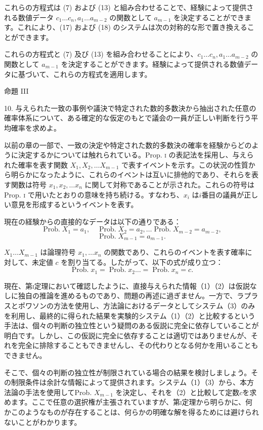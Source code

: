 \documentclass[a4paper,11pt,openany]{ltjsbook}
\begin{document}
これらの方程式は (7) および (13) と組み合わせることで、経験によって提供される数値データ $c_1 \dotsc c_n, a_1 \dotsc a_{m-2}$ の関数として $a_{m-1}$ を決定することができます。これにより、(17) および (18) のシステムは次の対称的な形で置き換えることができます。

これらの方程式と (7) 及び (13) を組み合わせることにより、$c_1 \dotsc c_n, a_1 \dotsc a_{m-2}$ の関数として $a_{m-1}$ を決定することができます。経験によって提供される数値データに基づいて、これらの方程式を適用します。

命題 III

10. 与えられた一致の事例や議決で特定された数的多数決から抽出された任意の確率体系について、ある確定的な仮定のもとで議会の一員が正しい判断を行う平均確率を求めよ。

以前の章の一部で、一致の決定や特定された数的多数決の確率を経験からどのように決定するかについては触れられている。Prop. \textsc{i} の表記法を採用し、与えられた確率を表す関数 $X_1, X_2, \dotsc X_{m-1}$ で表すイベントを示す。この状況の性質から明らかになったように、これらのイベントは互いに排他的であり、それらを表す関数は符号 $x_1, x_2, \dots x_n$ に関して対称であることが示された。これらの符号は Prop. \textsc{i} で用いたとおりの意味を持ち続ける。すなわち、$x_i$ は$i$番目の議員が正しい意見を形成するというイベントを表す。

現在の経験からの直接的なデータは以下の通りである：
\[
\operatorname{Prob. } X_1 = a_1, \quad
\operatorname{Prob. } X_2 = a_2, \dotsc
\operatorname{Prob. } X_{m-2} = a_{m-2},
\]
\[
\operatorname{Prob. } X_{m-1} = a_{m-1}.
\]

$X_1\dots X_{m-1}$ は論理符号 $x_1, \dotsc x_n$ の関数であり、これらのイベントを表す確率に対して、未定値 $c$ を割り当てる。したがって、以下の式が成り立つ：
\[
\operatorname{Prob. } x_1 = \operatorname{Prob. } x_2 \dots = \operatorname{Prob. } x_n = c.
\]

現在、第\textsc{i}定理において確認したように、直接与えられた情報（1）（2）は仮説なしに独自の推論を進めるものであり、問題の再述に過ぎません。一方で、ラプラスとポワソンの方法を使用し、方法論におけるデータとしてシステム（3）のみを利用し、最終的に得られた結果を実験的システム（1）（2）と比較するという手法は、個々の判断の独立性という疑問のある仮説に完全に依存していることが明白です。しかし、この仮説に完全に依存することは適切ではありませんが、それを完全に排除することもできませんし、その代わりとなる何かを用いることもできません。

そこで、個々の判断の独立性が制限されている場合の結果を検討しましょう。その制限条件は余計な情報によって提供されます。システム（1）（3）から、本方法論の手法を使用してProb. $X_{m-1}$ を決定し、それを（2）と比較して定数$c$を求めます。ここで任意の選択権が主張されていますが、第\textsc{i}定理から明らかに、何かこのようなものが存在することは、何らかの明確な解を得るためには避けられないことがわかります。
\end{document}
